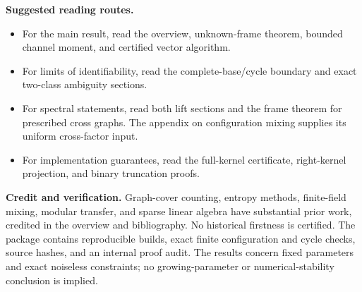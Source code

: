 \documentclass[10pt]{article}
\begin{document}
\textbf{Suggested reading routes.}

\begin{itemize}
\item For the main result, read the overview, unknown-frame theorem,
bounded channel moment, and certified vector algorithm.
\item For limits of identifiability, read the complete-base/cycle
boundary and exact two-class ambiguity sections.
\item For spectral statements, read both lift sections and
the frame theorem for prescribed cross graphs. The appendix on
configuration mixing supplies its uniform cross-factor input.
\item For implementation guarantees, read the full-kernel certificate,
right-kernel projection, and binary truncation proofs.
\end{itemize}

\textbf{Credit and verification.}
Graph-cover counting, entropy methods, finite-field mixing, modular
transfer, and sparse linear algebra have substantial prior work,
credited in the overview and bibliography. No historical firstness
is certified. The package contains reproducible builds, exact finite
configuration and cycle checks, source hashes, and an internal proof
audit. The results concern fixed parameters and exact noiseless
constraints; no growing-parameter or numerical-stability conclusion
is implied.
\end{document}
